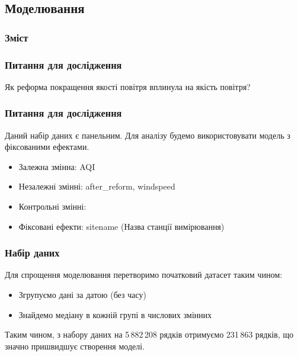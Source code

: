 ﻿\documentclass{beamer}
\begin{document}
% 

\begin{frame}
  \section{Моделювання}

  \frametitle{Зміст}
  \tableofcontents[currentsection]
\end{frame}

\begin{frame}
  \frametitle{Питання для дослідження}

  Як реформа покращення якості повітря вплинула на якість повітря?
\end{frame}

\begin{frame}
  \frametitle{Питання для дослідження}

  Даний набір даних є панельним. Для аналізу будемо використовувати модель з фіксованими ефектами.

  \begin{itemize}
    \item Залежна змінна: AQI
    \item Незалежні змінні: after\_reform\footnotemark, windspeed
    \item Контрольні змінні:  
    \item Фіксовані ефекти: sitename (Назва станції вимірювання)
  \end{itemize}

\end{frame}

\begin{frame}
  \frametitle{Набір даних}

  Для спрощення моделювання перетворимо початковий датасет таким чином:
  
  \begin{itemize}
    \item Згрупуємо дані за датою (без часу)
    \item Знайдемо медіану в кожній групі в числових змінних
  \end{itemize}

  Таким чином, з набору даних на 5\,882\,208 рядків отримуємо 231\,863 рядків, що значно пришвидшує створення моделі.
\end{frame}
\end{document}
